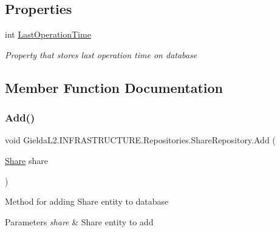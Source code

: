 \subsection*{Properties}
\begin{DoxyCompactItemize}
\item 
int \mbox{\hyperlink{class_gielda_l2_1_1_i_n_f_r_a_s_t_r_u_c_t_u_r_e_1_1_repositories_1_1_share_repository_ad778ea8d672a171a35af26957efe3c88}{Last\+Operation\+Time}}
\begin{DoxyCompactList}\small\item\em Property that stores last operation time on database \end{DoxyCompactList}\end{DoxyCompactItemize}


\subsection{Member Function Documentation}
\mbox{\label{class_gielda_l2_1_1_i_n_f_r_a_s_t_r_u_c_t_u_r_e_1_1_repositories_1_1_share_repository_ab72f6f527449750b41956b564c892a7c}} 
\subsubsection{\texorpdfstring{Add()}{Add()}}
{\footnotesize\ttfamily void Gielda\+L2.\+I\+N\+F\+R\+A\+S\+T\+R\+U\+C\+T\+U\+R\+E.\+Repositories.\+Share\+Repository.\+Add (\begin{DoxyParamCaption}\item[{\mbox{\hyperlink{class_gielda_l2_1_1_d_b_1_1_entities_1_1_share}{Share}}}]{share }\end{DoxyParamCaption})}



Method for adding Share entity to database 


\begin{DoxyParams}{Parameters}
{\em share} & Share entity to add\\
\hline
\end{DoxyParams}


